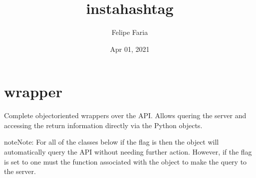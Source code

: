 \documentclass[letterpaper,10pt,english,openany,oneside]{sphinxmanual}
\title{instahashtag}
\date{Apr 01, 2021}
\author{Felipe Faria}
\begin{document}
\pagestyle{empty}
\sphinxmaketitle
\pagestyle{plain}
\sphinxtableofcontents
\pagestyle{normal}
\label{\detokenize{index::doc}}



\chapter{wrapper}
\label{\detokenize{source/wrapper:wrapper}}\label{\detokenize{source/wrapper::doc}}
\begin{sphinxVerbatim}[commandchars=\\\{\}]
     
\end{sphinxVerbatim}

Complete object\sphinxhyphen{}oriented wrappers over the API. Allows quering the server and accessing
the return information directly via the Python objects.

\begin{sphinxadmonition}{note}{Note:}
For all of the classes below if the  flag is  then the object will
automatically query the API without needing further action. However, if the 
flag is set to  one must  the  function associated
with the object to make the query to the server.

\begin{sphinxVerbatim}[commandchars=\\\{\}]
   
 

  
      
     
\end{sphinxVerbatim}
\end{sphinxadmonition}
\end{document}
